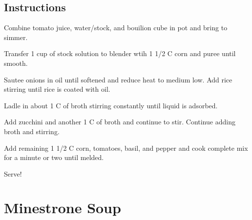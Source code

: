 \documentclass[ansiapaper,10pt,english]{sphinxmanual}
\begin{document}
\section{Instructions}
\label{\detokenize{Mid_Risotto:instructions}}
Combine tomato juice, water/stock, and bouilion cube in pot and bring to simmer.

Transfer 1 cup of stock solution to blender wtih 1 1/2 C corn and puree until smooth.

Sautee onions in oil until softened and reduce heat to medium low. Add rice stirring until rice is coated with oil.

Ladle in about 1 C of broth stirring constantly until liquid is adsorbed.

Add zucchini and another 1 C of broth and continue to stir.  Continue adding broth and stirring.

Add remaining 1 1/2 C corn, tomatoes, basil, and pepper and cook complete mix for a minute or two until melded.

Serve!


\chapter{Minestrone Soup}
\label{\detokenize{Minestrone:minestrone-soup}}\label{\detokenize{Minestrone::doc}}
\end{document}
